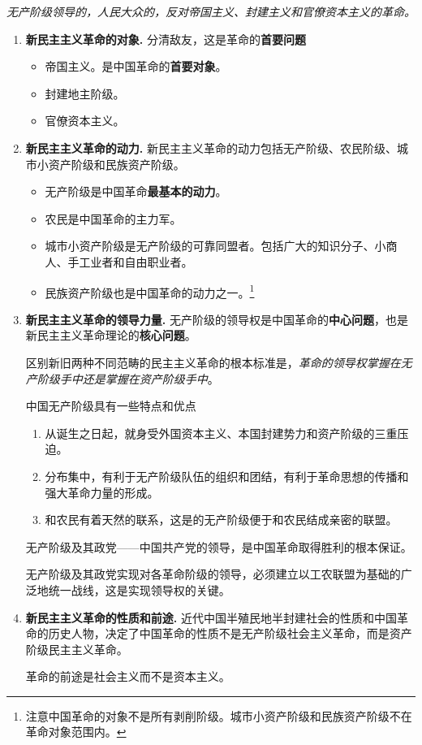     \begin{center}
        \emph{无产阶级领导的，人民大众的，反对帝国主义、封建主义和官僚资本主义的革命。}
    \end{center}

    \begin{enumerate}
        \item \textbf{新民主主义革命的对象.}
        分清敌友，这是革命的\textbf{首要问题}
        \begin{itemize}
            \item 帝国主义。是中国革命的\textbf{首要对象}。
            \item 封建地主阶级。
            \item 官僚资本主义。
        \end{itemize}
        \item \textbf{新民主主义革命的动力.}
        新民主主义革命的动力包括无产阶级、农民阶级、城市小资产阶级和民族资产阶级。
        \begin{itemize}
            \item 无产阶级是中国革命\textbf{最基本的动力}。
            \item 农民是中国革命的主力军。
            \item 城市小资产阶级是无产阶级的可靠同盟者。包括广大的知识分子、小商人、手工业者和自由职业者。
            \item 民族资产阶级也是中国革命的动力之一。\footnote{注意中国革命的对象不是所有剥削阶级。城市小资产阶级和民族资产阶级不在革命对象范围内。}
        \end{itemize}
        \item \textbf{新民主主义革命的领导力量.}
        无产阶级的领导权是中国革命的\textbf{中心问题}，也是新民主主义革命理论的\textbf{核心问题}。

        区别新旧两种不同范畴的民主主义革命的根本标准是，\emph{革命的领导权掌握在无产阶级手中还是掌握在资产阶级手中}。

        中国无产阶级具有一些特点和优点
        \begin{enumerate}
            \item 从诞生之日起，就身受外国资本主义、本国封建势力和资产阶级的三重压迫。
            \item 分布集中，有利于无产阶级队伍的组织和团结，有利于革命思想的传播和强大革命力量的形成。
            \item 和农民有着天然的联系，这是的无产阶级便于和农民结成亲密的联盟。
        \end{enumerate}
        无产阶级及其政党——中国共产党的领导，是中国革命取得胜利的根本保证。

        无产阶级及其政党实现对各革命阶级的领导，必须建立以工农联盟为基础的广泛地统一战线，这是实现领导权的关键。

        \item \textbf{新民主主义革命的性质和前途.}
        近代中国半殖民地半封建社会的性质和中国革命的历史人物，决定了中国革命的性质不是无产阶级社会主义革命，而是资产阶级民主主义革命。

        革命的前途是社会主义而不是资本主义。
    \end{enumerate}

